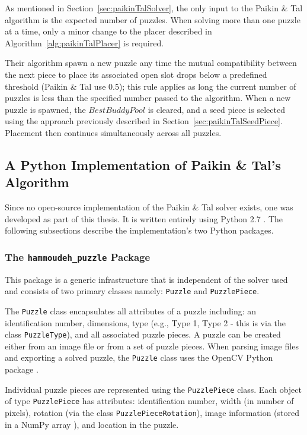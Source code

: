 \documentclass{report}
\newcommand{\hammoudehPuzzlePackage}{\texttt{hammoudeh\_puzzle} }
\begin{document}
As mentioned in Section~\ref{sec:paikinTalSolver}, the only input to the Paikin \& Tal algorithm is the expected number of puzzles.   When solving more than one puzzle at a time, only a minor change to the placer described in Algorithm~\ref{alg:paikinTalPlacer} is required.

Their algorithm spawn a new puzzle any time the mutual compatibility between the next piece to place its associated open slot drops below a predefined threshold (Paikin \& Tal use 0.5); this rule applies as long the current number of puzzles is less than the specified number passed to the algorithm.  When a new puzzle is spawned, the $BestBuddyPool$ is cleared, and a seed piece is selected using the approach previously described in Section~\ref{sec:paikinTalSeedPiece}.   Placement then continues simultaneously across all puzzles.


\subsection{A Python Implementation of Paikin \& Tal's Algorithm}\label{sec:pythonPaikinTalAlgorithm}

Since no open-source implementation of the Paikin \& Tal solver exists, one was developed as part of this thesis.  It is written entirely using Python 2.7 \cite{python}.  The following subsections describe the implementation's two Python packages.  

\subsubsection{The \hammoudehPuzzlePackage Package}\label{sec:hammoudehPuzzlePackage}

This package is a generic infrastructure that is independent of the solver used and consists of two primary classes namely: \texttt{Puzzle} and \texttt{PuzzlePiece}.  

The \texttt{Puzzle} class encapsulates all attributes of a puzzle including: an identification number, dimensions, type (e.g., Type 1, Type 2 - this is via the class \texttt{PuzzleType}), and all associated puzzle pieces.  A puzzle can be created either from an image file or from a set of puzzle pieces.   When parsing image files and exporting a solved puzzle, the \texttt{Puzzle} class uses the OpenCV Python package \cite{opencv_library}. 

Individual puzzle pieces are represented using the \texttt{PuzzlePiece} class.  Each object of type \texttt{PuzzlePiece} has attributes: identification number, width (in number of pixels), rotation (via the class \texttt{PuzzlePieceRotation}), image information (stored in a NumPy array \cite{walt2011}), and location in the puzzle.
\end{document}

